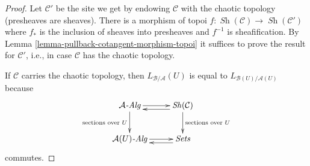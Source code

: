 \documentclass[10pt,a4paper]{amsart}
\theoremstyle{plain}
\theoremstyle{definition}
\theoremstyle{remark}
\numberwithin{equation}{subsection}
\def\Sh{\mathop{\mathit{Sh}}\nolimits}
\begin{document}
\begin{proof}
Let $\mathcal{C}'$ be the site we get by endowing $\mathcal{C}$ with the
chaotic topology (presheaves are sheaves). There is a morphism of topoi
$f : \Sh(\mathcal{C}) \to \Sh(\mathcal{C}')$ where $f_*$ is the inclusion
of sheaves into presheaves and $f^{-1}$ is sheafification.
By Lemma \ref{lemma-pullback-cotangent-morphism-topoi}
it suffices to prove the result for $\mathcal{C}'$, i.e.,
in case $\mathcal{C}$ has the chaotic topology.

\medskip\noindent
If $\mathcal{C}$ carries the chaotic topology, then
$L_{\mathcal{B}/\mathcal{A}}(U)$ is equal to
$L_{\mathcal{B}(U)/\mathcal{A}(U)}$ because
$$
\xymatrix{
\mathcal{A}\textit{-Alg} \ar[d]_{\text{sections over }U} \ar[r] &
\Sh(\mathcal{C}) \ar@<1ex>[l] \ar[d]^{\text{sections over }U} \\
\mathcal{A}(U)\textit{-Alg} \ar[r] & \textit{Sets} \ar@<1ex>[l]
}
$$
commutes.
\end{proof}
\end{document}
